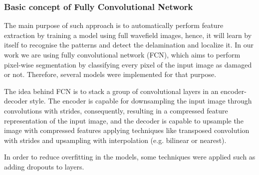\documentclass[preprint,9pt]{elsarticle}
\begin{document}
\subsubsection{Basic concept of Fully Convolutional Network}
The main purpose of such approach is to automatically perform feature extraction by training a model using full wavefield images, hence, it will learn by itself to recognise the patterns and detect the delamination and localize it.
In our work we are using fully convolutional network (FCN), which aims to perform pixel-wise segmentation by classifying every pixel of the input image as damaged or not. 
Therefore, several models were implemented for that purpose.

The idea behind FCN is to stack a group of convolutional layers in an encoder-decoder style. 
The encoder is capable for downsampling the input image through convolutions with strides, consequently, resulting in a compressed feature representation of the input image, and the decoder is capable to upsample the image with compressed features applying techniques like transposed convolution with strides and upsampling with interpolation (e.g. bilinear or nearest).


In order to reduce overfitting in the models, some techniques were applied such as adding dropouts to layers.
\end{document}
